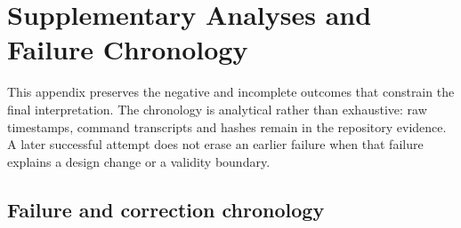 \chapter{Supplementary Analyses and Failure Chronology}
\label{app:supplementary}

This appendix preserves the negative and incomplete outcomes that constrain the
final interpretation. The chronology is analytical rather than exhaustive: raw
timestamps, command transcripts and hashes remain in the repository evidence.
A later successful attempt does not erase an earlier failure when that failure
explains a design change or a validity boundary.

\section{Failure and correction chronology}

